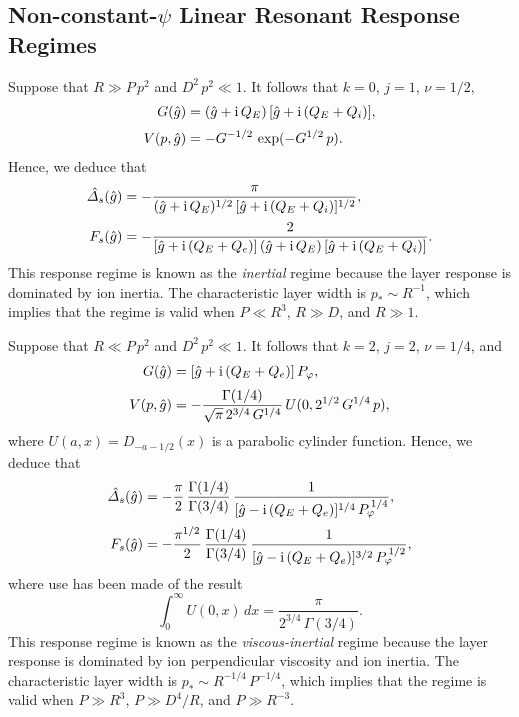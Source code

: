 \documentclass[12pt,prb,aps]{revtex4-1}
\begin{document}
\subsection{Non-constant-$\psi$ Linear Resonant Response Regimes}\label{snonc}
Suppose that $R\gg P\,p^2$ and $D^2\,p^2 \ll 1$. It follows that $k=0$, $j=1$, $\nu=1/2$, 
\begin{align}
G(\hat{g}) &= (\hat{g}+{\rm i}\,Q_E)\,[\hat{g}+{\rm i}\,(Q_E+Q_i)],\\[0.5ex]
V(p,\hat{g})&= -G^{-1/2}\,\exp(-G^{1/2}\,p).
\end{align}
Hence, we deduce that
\begin{align}\label{eia}
\hat{\mit\Delta}_s(\hat{g}) &= -\frac{\pi}{(\hat{g}+{\rm i}\,Q_E)^{1/2}\,[\hat{g}+{\rm i}\,(Q_E+Q_i)]^{1/2}},\\[0.5ex]
F_s(\hat{g})&= - \frac{2}{[\hat{g}+{\rm i}\,(Q_E+Q_e)]\,(\hat{g}+{\rm i}\,Q_E)\,[\hat{g}+{\rm i}\,(Q_E+Q_i)]}.\label{eib}
\end{align}
This response regime is known as the {\em inertial}\/ regime because the layer response is dominated by
 ion inertia.\cite{ara,err1a} The characteristic layer width is $p_\ast \sim R^{-1}$,
which implies that the regime is valid when $P\ll R^3$, $R\gg D$, and $R\gg 1$. 

Suppose that $R\ll P\,p^2$ and $D^2\,p^2 \ll 1$. It follows that $k=2$, $j=2$, $\nu=1/4$, and
\begin{align}
G(\hat{g}) &= [\hat{g}+{\rm i}\,(Q_E+Q_e)]\,P_\varphi,\\[0.5ex]
V(p,\hat{g})&= - \frac{\Gamma(1/4)}{\sqrt{\pi}\,2^{3/4}\,G^{1/4}}\,U(0,2^{1/2}\,G^{1/4}\,p),
\end{align}
where $U(a,x)=D_{-a-1/2}(x)$ is a parabolic cylinder function.\cite{abram}
Hence, we deduce that
\begin{align}\label{evia}
\hat{\mit\Delta}_s(\hat{g}) &=- \frac{\pi}{2}\,\frac{\Gamma(1/4)}{\Gamma(3/4)}\,\frac{1}{[\hat{g}-{\rm i}\,(Q_E+Q_e)]^{1/4}\,P_\varphi^{\,1/4}},\\[0.5ex]
F_s(\hat{g}) &= - \frac{\pi^{1/2}}{2}\,\frac{\Gamma(1/4)}{\Gamma(3/4)}\,\frac{1}{[\hat{g}-{\rm i}\,(Q_E+Q_e)]^{3/2}\,P_\varphi^{\,1/2}},\label{evib}
\end{align}
where use has been made of the result
\begin{equation}
\int_0^\infty U(0,x)\,dx= \frac{\pi}{2^{3/4}\,\Gamma(3/4)}.
\end{equation}
This response regime is known as the {\em viscous-inertial}\/ regime because the layer response is dominated by
ion perpendicular viscosity and ion inertia.\cite{err1a} 
 The characteristic layer width is $p_\ast \sim R^{-1/4}\,P^{-1/4}$,
which implies that the regime is valid when $P\gg R^3$, $P\gg D^4/R$, and $P\gg R^{-3}$. 
\end{document}
